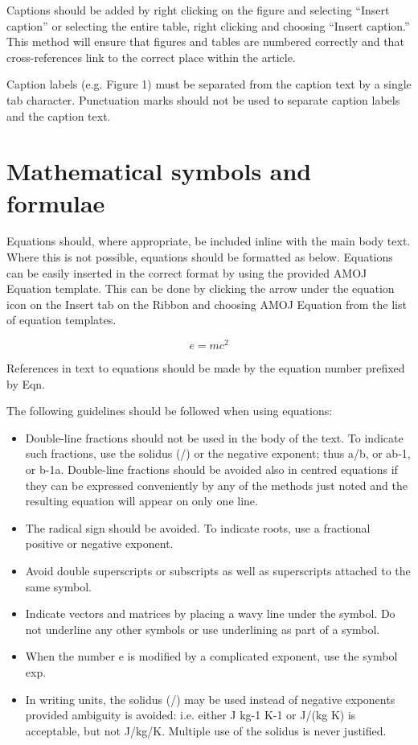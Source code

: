 \documentclass[10pt]{article}
\begin{document}
Captions should be added by right clicking on the figure and selecting “Insert caption” or selecting the entire table, right clicking and choosing “Insert caption.” This method will ensure that figures and tables are numbered correctly and that cross-references link to the correct place within the article.

Caption labels (e.g. Figure 1) must be separated from the caption text by a single tab character. Punctuation marks should not be used to separate caption labels and the caption text.

\section{Mathematical symbols and formulae}
\label{MathematicalSymbolsFormualae}
Equations should, where appropriate, be included inline with the main body text. Where this is not possible, equations should be formatted as below. Equations can be easily inserted in the correct format by using the provided AMOJ Equation template. This can be done by clicking the arrow under the equation icon on the Insert tab on the Ribbon and choosing AMOJ Equation from the list of equation templates.

\begin{equation}
e = mc^2
\end{equation}

References in text to equations should be made by the equation number prefixed by Eqn.

The following guidelines should be followed when using equations:
\begin{itemize}
  \item Double-line fractions should not be used in the body of the text. To indicate such fractions, use the solidus (/) or the negative exponent; thus a/b, or ab-1, or b-1a. Double-line fractions should be avoided also in centred equations if they can be expressed conveniently by any of the methods just noted and the resulting equation will appear on only one line.
  \item The radical sign should be avoided. To indicate roots, use a fractional positive or negative exponent.
  \item Avoid double superscripts or subscripts as well as superscripts attached to the same symbol.
  \item Indicate vectors and matrices by placing a wavy line under the symbol. Do not underline any other symbols or use underlining as part of a symbol.
  \item When the number e is modified by a complicated exponent, use the symbol exp.
  \item In writing units, the solidus (/) may be used instead of negative exponents provided ambiguity is avoided: i.e. either J kg-1 K-1 or J/(kg K) is acceptable, but not J/kg/K. Multiple use of the solidus is never justified.
\end{itemize}
\end{document}

